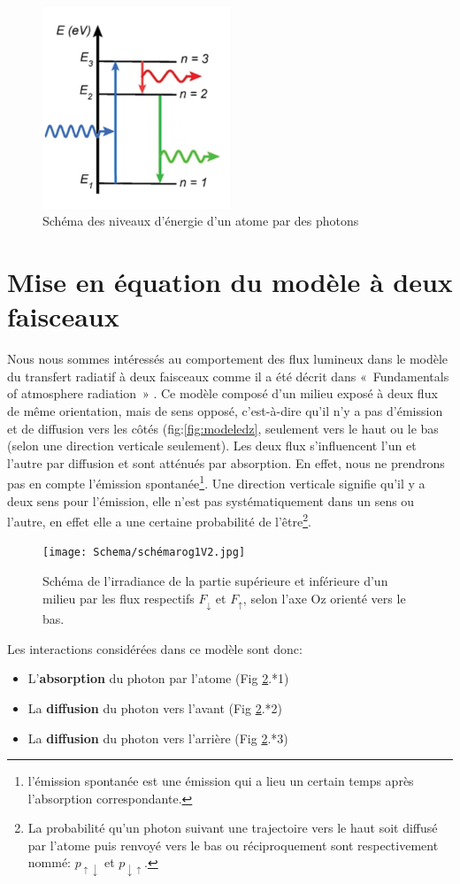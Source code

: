 \documentclass[12pt]{article}
\begin{document}
\begin{figure}[H]
    \centering
    \includegraphics[width=0.5\textwidth]{Schema/nivenergie.png}
    \caption{Schéma des niveaux d'énergie d'un atome par des photons}
    \label{fig:niveau d'énergie}
\end{figure}
\section{Mise en équation du modèle à deux faisceaux}
Nous nous sommes intéressés au comportement des flux lumineux dans le modèle du transfert radiatif à deux faisceaux comme il a été décrit dans «~Fundamentals of atmosphere radiation~» \cite{textbook}.
Ce modèle composé d'un milieu exposé à deux flux de même orientation, mais de sens opposé, c’est-à-dire qu'il n'y a pas d'émission et de diffusion vers les côtés (fig:\ref{fig:modeledz}, seulement vers le haut ou le bas (selon une direction verticale seulement).
Les deux flux s'influencent l'un et l'autre par diffusion et sont atténués par absorption. 
En effet, nous ne prendrons pas en compte l'émission spontanée\footnote{l'émission spontanée est une émission qui a lieu un certain temps après l'absorption correspondante.}.
Une direction verticale signifie qu'il y a deux sens pour l'émission, elle n'est pas systématiquement dans un sens ou l'autre, en effet elle a une certaine probabilité de l'être\footnote{La probabilité qu'un photon suivant une trajectoire vers le haut soit diffusé par l'atome puis renvoyé vers le bas ou réciproquement sont respectivement nommé: $p_{{\uparrow}{\downarrow}}$ et $p_{{\downarrow}{\uparrow}}$.}. \par

\begin{figure}[H]
  \centering
  \texttt{[image: Schema/schémarog1V2.jpg]}
  \caption{Schéma de l'irradiance de la partie supérieure et inférieure d'un milieu par les flux respectifs ${F_{\downarrow}}$ et ${F_{\uparrow}}$, selon l'axe Oz orienté vers le bas.}
  \label{fig:photo}
\end{figure}
Les interactions considérées dans ce modèle sont donc:
\begin{itemize}
  \item L'\textbf{absorption} du photon par l'atome (Fig \ref{fig:photo}.*1)
  \item La \textbf{diffusion} du photon vers l'avant (Fig \ref{fig:photo}.*2)
  \item La \textbf{diffusion} du photon vers l'arrière (Fig \ref{fig:photo}.*3)
\end{itemize}
\end{document}
